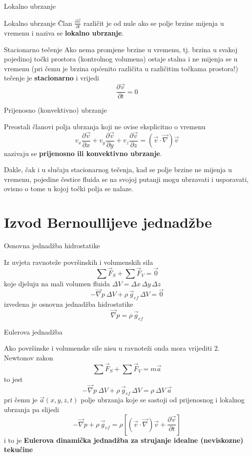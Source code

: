 \documentclass[croatian]{beamer}
\begin{document}
\begin{frame}{Lokalno ubrzanje}

\begin{block}{Lokalno ubrzanje}
Član $\frac{\partial\vec{v}}{\partial t}$ različit je od nule ako
se polje brzine mijenja u vremenu i naziva se \textbf{lokalno ubrzanje}.
\end{block}
\begin{alertblock}{Stacionarno tečenje}
Ako nema promjene brzine u vremenu, tj. brzina u svakoj pojedinoj
točki prostora (kontrolnog volumena) ostaje stalna i ne mijenja se
u vremenu (pri čemu je brzina općenito različita u različitim točkama
prostora!) tečenje je \textbf{stacionarno }i vrijedi
\[
\frac{\partial\vec{v}}{\partial t}=0
\]
\end{alertblock}
\end{frame}

\begin{frame}{Prijenosno (konvektivno) ubrzanje}

Preostali članovi polja ubrzanja koji ne ovise eksplicitno o vremenu
\[
v_{x}\frac{\partial\vec{v}}{\partial x}+v_{y}\frac{\partial\vec{v}}{\partial y}+v_{z}\frac{\partial\vec{v}}{\partial z}=(\vec{v}\cdot\vec{\nabla})\vec{v}
\]
nazivaju se \textbf{prijenosno ili konvektivno ubrzanje}.
\begin{block}{}
Dakle, čak i u slučaju stacionarnog tečenja, kad se polje brzine
ne mijenja u vremenu, pojedine čestice fluida se na svojoj putanji
mogu ubrzavati i usporavati, ovisno o tome u kojoj točki polja se
nalaze.
\end{block}
\end{frame}

\section{Izvod Bernoullijeve jednadžbe}

\begin{frame}{Osnovna jednadžba hidrostatike}

Iz uvjeta ravnoteže površinskih i volumenskih sila 
\[
\sum\vec{F}_{S}+\sum\vec{F}_{V}=\vec{0}
\]
koje djeluju na mali volumen fluida $\Delta V=\Delta x\,\Delta y\,\Delta z$
\[
-\vec{\nabla}p\:\Delta V+\rho\,\vec{g}_{ef}\,\Delta V=\vec{0}
\]
izvedena je osnovna jednadžba hidrostatike
\[
\vec{\nabla}p=\rho\,\vec{g}_{ef}
\]
\end{frame}

\begin{frame}{Eulerova jednadžba}

Ako površinske i volumenske sile nisu u ravnoteži onda mora vrijediti
2. Newtonov zakon
\[
\sum\vec{F}_{S}+\sum\vec{F}_{V}=m\vec{a}
\]
to jest
\[
-\vec{\nabla}p\:\Delta V+\rho\,\vec{g}_{ef}\,\Delta V=\rho\:\Delta V\:\vec{a}
\]
pri čemu je $\vec{a}(x,y,z,t)$ polje ubrzanja koje se sastoji od
prijenosnog i lokalnog ubrzanja pa slijedi
\[
-\vec{\nabla}p+\rho\,\vec{g}_{ef}=\rho[(\vec{v}\cdot\vec{\nabla})\vec{v}+\frac{\partial\vec{v}}{\partial t}]
\]
i to je \textbf{Eulerova dinamička jednadžba za strujanje idealne
(neviskozne) tekućine}
\end{frame}
\end{document}
